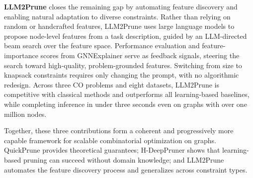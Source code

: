 \textbf{LLM2Prune} closes the remaining gap by automating feature discovery and
enabling natural adaptation to diverse constraints. Rather than relying on random or
handcrafted features, LLM2Prune uses large language models to propose node-level
features from a task description, guided by an LLM-directed beam search over the feature
space. Performance evaluation and feature-importance scores from GNNExplainer serve as
feedback signals, steering the search toward high-quality, problem-grounded features.
Switching from size to knapsack constraints requires only changing the prompt, with no
algorithmic redesign. Across three CO problems and eight datasets, LLM2Prune is
competitive with classical methods and outperforms all learning-based baselines, while
completing inference in under three seconds even on graphs with over one million nodes.

Together, these three contributions form a coherent and progressively more capable
framework for scalable combinatorial optimization on graphs. QuickPrune provides
theoretical guarantees; H-DeepPruner shows that learning-based pruning can succeed
without domain knowledge; and LLM2Prune automates the feature discovery process and
generalizes across constraint types.
